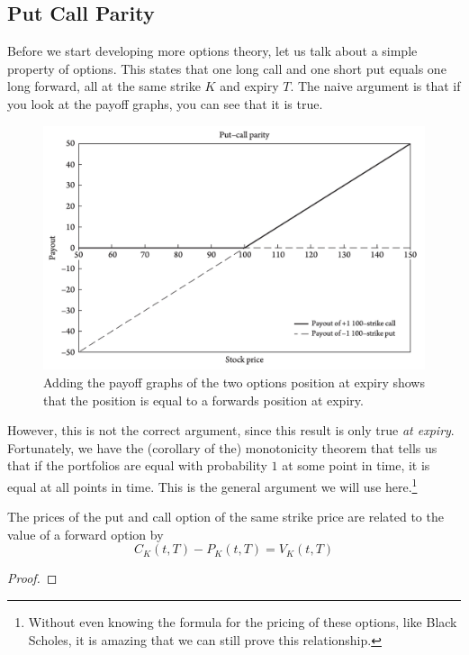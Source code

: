 \documentclass{article}
\begin{document}
  \subsection{Put Call Parity}
    
    Before we start developing more options theory, let us talk about a simple property of options. This states that one long call and one short put equals one long forward, all at the same strike $K$ and expiry $T$. The naive argument is that if you look at the payoff graphs, you can see that it is true. 

    \begin{figure}[H]
      \centering 
      \includegraphics[scale=0.32]{img/put_call_parity.png}
      \caption{Adding the payoff graphs of the two options position at expiry shows that the position is equal to a forwards position at expiry. } 
      \label{fig:put_call_parity}
    \end{figure}

    However, this is not the correct argument, since this result is only true \textit{at expiry}. Fortunately, we have the (corollary of the) monotonicity theorem that tells us that if the portfolios are equal with probability $1$ at some point in time, it is equal at all points in time. This is the general argument we will use here.\footnote{Without even knowing the formula for the pricing of these options, like Black Scholes, it is amazing that we can still prove this relationship. } 

    \begin{lemma}
      The prices of the put and call option of the same strike price are related to the value of a forward option by 
      \begin{equation}
        C_K (t, T) - P_K (t, T) = V_K (t, T)
      \end{equation}
    \end{lemma}
    \begin{proof}
      
    \end{proof}
\end{document}
